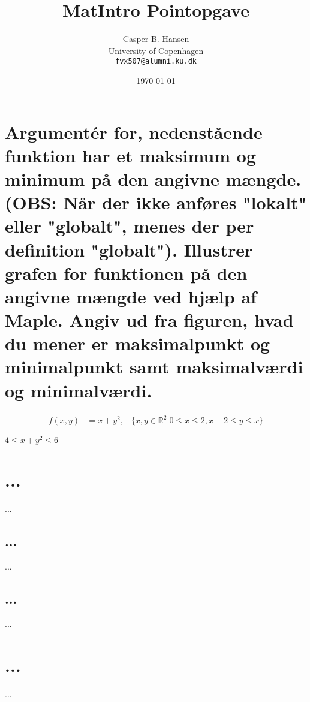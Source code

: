 \documentclass[11pt,a4paper]{article}
\title{MatIntro Pointopgave \assignmentnumber}
\author
{
    Casper B. Hansen\\
    University of Copenhagen\\
    {\tt fvx507@alumni.ku.dk}
}
\date{\today}
\begin{document}


\section
{
    \mdseries
    Argumentér for, nedenstående funktion har et maksimum og minimum på den
    angivne mængde. (OBS: Når der ikke anføres "lokalt" eller "globalt", menes
    der per definition "globalt"). Illustrer grafen for funktionen på den
    angivne mængde ved hjælp af Maple. Angiv ud fra figuren, hvad du mener er
    maksimalpunkt og minimalpunkt samt maksimalværdi og minimalværdi.
}
\begin{align}
    f(x,y) &= x + y^2
    \text{,}\quad
    \{x,y \in \mathbb{R}^2 | 0 \leq x \leq 2, x - 2 \leq y \leq x\}
\end{align}

$4 \leq x + y^2 \leq 6$

\section
{
    \mdseries
    ...
}
...

\subsection
{
    \mdseries
    ...
}
...

\subsection
{
    \mdseries
    ...
}
...

\section
{
    \mdseries
    ...
}
...
\end{document}
